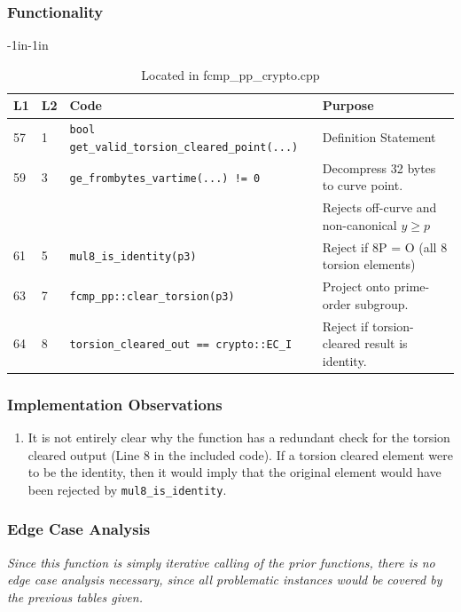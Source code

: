 \documentclass[12pt,titlepage,table]{article}
\begin{document}
\subsubsection{Functionality}


\begin{table}[htbp]
\caption{get\_valid\_cleared\_torsion\_point Source To Spec Map}
\begin{adjustwidth}{-1in}{-1in}
\centering
{
\begin{tabular}{| l | l | l | l |}
\hline
\textbf{L1} & \textbf{L2} & \textbf{Code} & \textbf{Purpose} \\
\hline
\hline
57 & 1 & \verb+bool get_valid_torsion_cleared_point(...)+ & Definition Statement \\
59 & 3 & \verb+ge_frombytes_vartime(...) != 0+ & Decompress 32 bytes to curve point. \\ 
&&& Rejects off-curve and non-canonical $y \geq p$\\
61 & 5 & \verb+mul8_is_identity(p3)+ & Reject if 8P = O (all 8 torsion elements)\\
63 & 7 & \verb+fcmp_pp::clear_torsion(p3)+ & Project onto prime-order subgroup. \\
64 & 8 & \verb+torsion_cleared_out == crypto::EC_I+ & Reject if torsion-cleared result is identity. \\

\hline
\end{tabular}}
\end{adjustwidth}
\caption*{Located in fcmp\_pp\_crypto.cpp}
\end{table}

\subsubsection{Implementation Observations}
\begin{enumerate}
    \item It is not entirely clear why the function has a redundant check for the torsion cleared output (Line 8 in the included code). If a torsion cleared element were to be the identity, then it would imply that the original element would have been rejected by \verb+mul8_is_identity+.
\end{enumerate}
\subsubsection{Edge Case Analysis}
\textit{Since this function is simply iterative calling of the prior functions, there is no edge case analysis necessary, since all problematic instances would be covered by the previous tables given.}
\end{document}

